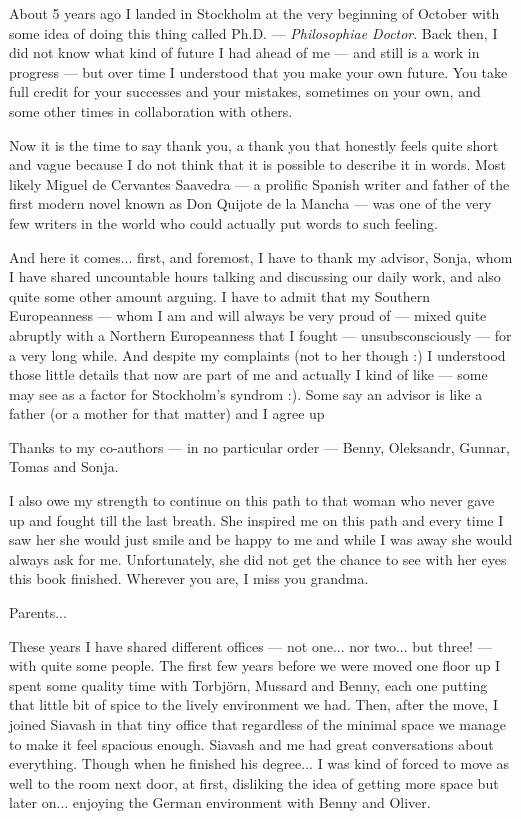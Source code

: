 
About 5 years ago I landed in Stockholm at the very beginning of October with some 
idea of doing this thing called Ph.D. --- \emph{Philosophiae Doctor}. Back then, 
I did not know what kind of future I had ahead of me --- and still is a work in 
progress --- but over time I understood that you make your own future. You take 
full credit for your successes and your mistakes, sometimes on your own, and some 
other times in collaboration with others.

Now it is the time to say thank you, a thank you that honestly feels quite short 
and vague because I do not think that it is possible to describe it in words. Most 
likely Miguel de Cervantes Saavedra --- a prolific Spanish writer and father of the first 
modern novel known as Don Quijote  de la Mancha --- was one of the very few writers 
in the world who could actually put words to such feeling.

And here it comes... first, and foremost, I have to thank my advisor, Sonja, whom 
I have shared uncountable hours talking and discussing our daily work, and also 
quite some other amount arguing. I have to admit that my Southern Europeanness --- whom I am 
and will always be very proud of --- mixed quite abruptly with a Northern Europeanness 
that I fought --- unsubsconsciously --- for a very long while. And despite my complaints 
(not to her though :) I understood those little details that now are part of me 
and actually I kind of like --- some may see as a factor for Stockholm's syndrom :).
Some say an advisor is like a father (or a mother for that matter) and I agree up 

Thanks to my co-authors --- in no particular order --- Benny, Oleksandr, Gunnar, 
Tomas and Sonja. 

I also owe my strength to continue on this path to that woman who never gave up 
and fought till the last breath. She inspired me on this path and every time I saw 
her she would just smile and be happy to me and while I was away she would always 
ask for me. Unfortunately, she did not get the chance to see with her eyes this 
book finished. Wherever you are, I miss you grandma.

Parents... 

These years I have shared different offices --- not one... nor two... but three! 
--- with quite some people. The first few years before we were moved one floor up 
I spent some quality time with Torbjörn, Mussard and Benny, each one putting that 
little bit of spice to the lively environment we had. Then, after the move, I joined 
Siavash in that tiny office that regardless of the minimal space we manage to make 
it feel spacious enough. Siavash and me had great conversations about everything.
Though when he finished his degree... I was kind of forced to move as well to the 
room next door, at first, disliking the idea of getting more space but later on... 
enjoying the German environment with Benny and Oliver.

